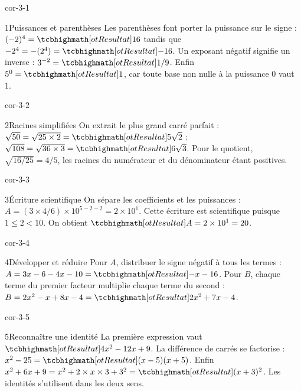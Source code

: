 \clearpage\pagestyle{otMain}\fontsize{11}{15}\selectfont
{}
\begin{blocLivre}{cor-3-1}
\begin{corrige}{1}{Puissances et parenthèses}
Les parenthèses font porter la puissance sur le signe : $(-2)^4=\res{16}$ tandis que $-2^4=-(2^4)=\res{-16}$. Un exposant négatif signifie un inverse : $3^{-2}=\res{1/9}$. Enfin $5^0=\res1$, car toute base non nulle à la puissance 0 vaut 1.
\end{corrige}
\end{blocLivre}
\begin{blocLivre}{cor-3-2}
\begin{corrige}{2}{Racines simplifiées}
On extrait le plus grand carré parfait : $\sqrt{50}=\sqrt{25\times2}=\res{5\sqrt2}$ ; $\sqrt{108}=\sqrt{36\times3}=\res{6\sqrt3}$. Pour le quotient, $\sqrt{16/25}=4/5$, les racines du numérateur et du dénominateur étant positives.
\end{corrige}
\end{blocLivre}
\begin{blocLivre}{cor-3-3}
\begin{corrige}{3}{Écriture scientifique}
On sépare les coefficients et les puissances : $A=(3\times4/6)\times10^{5-2-2}=2\times10^1$. Cette écriture est scientifique puisque $1\le2<10$. On obtient $\res{A=2\times10^1=20}$.
\end{corrige}
\end{blocLivre}
\begin{blocLivre}{cor-3-4}
\begin{corrige}{4}{Développer et réduire}
Pour $A$, distribuer le signe négatif à tous les termes : $A=3x-6-4x-10=\res{-x-16}$. Pour $B$, chaque terme du premier facteur multiplie chaque terme du second : $B=2x^2-x+8x-4=\res{2x^2+7x-4}$.
\end{corrige}
\end{blocLivre}
\begin{blocLivre}{cor-3-5}
\begin{corrige}{5}{Reconnaître une identité}
La première expression vaut $\res{4x^2-12x+9}$. La différence de carrés se factorise : $x^2-25=\res{(x-5)(x+5)}$. Enfin $x^2+6x+9=x^2+2\times x\times3+3^2=\res{(x+3)^2}$. Les identités s’utilisent dans les deux sens.
\end{corrige}
\end{blocLivre}
